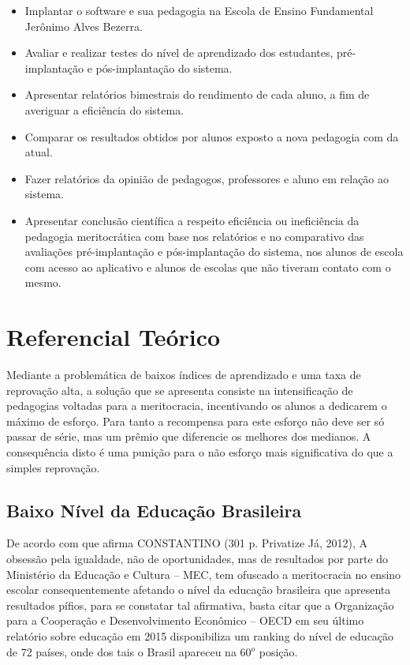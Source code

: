 \documentclass[
	article,			%
	11pt,				%
	oneside,			%
	a4paper,			%
	english,			%
	brazil,				%
	sumario=tradicional
	]{abntex2}
\begin{document}
\begin{itemize}
\item Implantar o software e  sua pedagogia na Escola de Ensino Fundamental Jerônimo Alves Bezerra. 
\item Avaliar e realizar testes do  nível de  aprendizado dos estudantes, pré-implantação e pós-implantação do sistema.
\item Apresentar  relatórios  bimestrais do rendimento de cada aluno, a fim de averiguar a eficiência do sistema. 

\item Comparar os resultados obtidos por alunos exposto a nova pedagogia com da atual.
\item Fazer relatórios da opinião de pedagogos, professores e aluno em relação ao sistema. 
\item Apresentar conclusão científica a respeito eficiência ou ineficiência da pedagogia meritocrática com base nos relatórios e no comparativo das avaliações pré-implantação e pós-implantação do sistema, nos alunos de escola com acesso ao aplicativo e alunos de escolas que não tiveram contato com o mesmo.            
\end{itemize}


\section{Referencial Teórico}

Mediante a problemática de baixos índices de aprendizado e uma taxa de reprovação alta, a solução que se apresenta consiste na intensificação de pedagogias voltadas para a meritocracia, incentivando os alunos a dedicarem o máximo de esforço. Para tanto a recompensa para este esforço não deve ser só passar de série, mas um prêmio que diferencie os melhores dos medianos. A consequência disto é uma punição para o não esforço mais significativa do que a simples reprovação. 
\subsection{Baixo Nível da Educação Brasileira}
De acordo com que afirma CONSTANTINO (301 p. Privatize Já, 2012), A obsessão pela igualdade, não de oportunidades, mas de resultados por parte do Ministério da Educação e Cultura – MEC, tem ofuscado a meritocracia no ensino escolar consequentemente afetando o nível da educação brasileira que apresenta resultados pífios, para se constatar tal afirmativa, basta citar que a Organização para a Cooperação e Desenvolvimento Econômico – OECD em seu último relatório sobre educação em 2015 disponibiliza um ranking do nível de educação de 72 países, onde dos tais o Brasil apareceu na 60$^{o}$ posição. 
\end{document}
